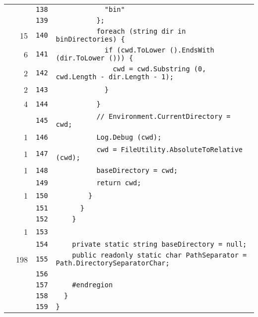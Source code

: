 \documentclass[a4paper,10pt]{article}
\begin{document}
\begin{longtable}[l]{lrrl}
\cellcolor{gray} &  & \verb~138~ & \verb~            "bin"~\\
\cellcolor{gray} &  & \verb~139~ & \verb~          };~\\
\cellcolor{green} & 15 & \verb~140~ & \verb~          foreach (string dir in binDirectories) {~\\
\cellcolor{green} & 6 & \verb~141~ & \verb~            if (cwd.ToLower ().EndsWith (dir.ToLower ())) {~\\
\cellcolor{green} & 2 & \verb~142~ & \verb~              cwd = cwd.Substring (0, cwd.Length - dir.Length - 1);~\\
\cellcolor{green} & 2 & \verb~143~ & \verb~            }~\\
\cellcolor{green} & 4 & \verb~144~ & \verb~          }~\\
\cellcolor{gray} &  & \verb~145~ & \verb~          // Environment.CurrentDirectory = cwd;~\\
\cellcolor{green} & 1 & \verb~146~ & \verb~          Log.Debug (cwd);~\\
\cellcolor{green} & 1 & \verb~147~ & \verb~          cwd = FileUtility.AbsoluteToRelative (cwd);~\\
\cellcolor{green} & 1 & \verb~148~ & \verb~          baseDirectory = cwd;~\\
\cellcolor{gray} &  & \verb~149~ & \verb~          return cwd;~\\
\cellcolor{green} & 1 & \verb~150~ & \verb~        }~\\
\cellcolor{gray} &  & \verb~151~ & \verb~      }~\\
\cellcolor{gray} &  & \verb~152~ & \verb~    }~\\
\cellcolor{green} & 1 & \verb~153~ & \verb~~\\
\cellcolor{gray} &  & \verb~154~ & \verb~    private static string baseDirectory = null;~\\
\cellcolor{green} & 198 & \verb~155~ & \verb~    public readonly static char PathSeparator = Path.DirectorySeparatorChar;~\\
\cellcolor{gray} &  & \verb~156~ & \verb~~\\
\cellcolor{gray} &  & \verb~157~ & \verb~    #endregion~\\
\cellcolor{gray} &  & \verb~158~ & \verb~  }~\\
\cellcolor{gray} &  & \verb~159~ & \verb~}~\\
\end{longtable}
\end{document}
